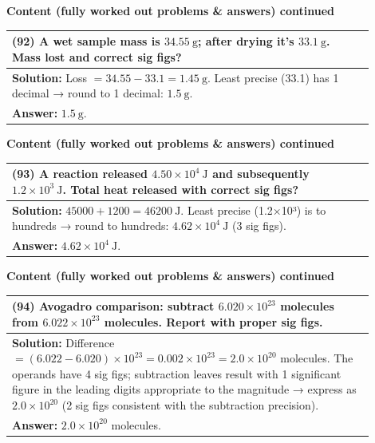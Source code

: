\documentclass{article}
\begin{document}
\noindent
{\large \textbf{Content (fully worked out problems \& answers) continued}} \\[0.2em]
\begin{tabular}{|p{0.9\linewidth}|}
\hline
\vspace{0.2cm}
\textbf{(92)} A wet sample mass is $34.55~\text{g}$; after drying it's $33.1~\text{g}$. Mass lost and correct sig figs? \\
\hline
\vspace{0.2cm}
\textbf{Solution:} Loss $=34.55-33.1=1.45~\text{g}$. Least precise (33.1) has 1 decimal → round to 1 decimal: $1.5~\text{g}$. \\
\textbf{Answer:} $1.5~\text{g}$. \\
\hline
\end{tabular}
\newpage

\noindent
{\large \textbf{Content (fully worked out problems \& answers) continued}} \\[0.2em]
\begin{tabular}{|p{0.9\linewidth}|}
\hline
\vspace{0.2cm}
\textbf{(93)} A reaction released $4.50\times10^{4}~\text{J}$ and subsequently $1.2\times10^{3}~\text{J}$. Total heat released with correct sig figs? \\
\hline
\vspace{0.2cm}
\textbf{Solution:} $45000+1200=46200~\text{J}$. Least precise (1.2×10³) is to hundreds → round to hundreds: $4.62\times10^{4}~\text{J}$ (3 sig figs). \\
\textbf{Answer:} $4.62\times10^{4}~\text{J}$. \\
\hline
\end{tabular}
\newpage

\noindent
{\large \textbf{Content (fully worked out problems \& answers) continued}} \\[0.2em]
\begin{tabular}{|p{0.9\linewidth}|}
\hline
\vspace{0.2cm}
\textbf{(94)} Avogadro comparison: subtract $6.020\times10^{23}$ molecules from $6.022\times10^{23}$ molecules. Report with proper sig figs. \\
\hline
\vspace{0.2cm}
\textbf{Solution:} Difference $= (6.022-6.020)\times10^{23}=0.002\times10^{23}=2.0\times10^{20}$ molecules. The operands have 4 sig figs; subtraction leaves result with 1 significant figure in the leading digits appropriate to the magnitude → express as $2.0\times10^{20}$ (2 sig figs consistent with the subtraction precision). \\
\textbf{Answer:} $2.0\times10^{20}$ molecules. \\
\hline
\end{tabular}
\newpage
\end{document}
